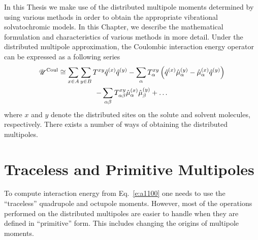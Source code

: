 \documentclass[b5paper,oneside,fleqn,11pt]{book}
\begin{document}
\begin{appendices}
\begin{refsection}
In this Thesis we make use of the distributed multipole 
moments determined by using various methods in order to obtain
the appropriate vibrational solvatochromic models. In this Chapter,
we describe the mathematical formulation and characteristics of various methods
in more detail.
Under the distributed multipole approximation, the Coulombic
interaction energy operator can be expressed as a following series \citep{Stone.TheTheoryOfIntermolecularForces.1996}
%
\begin{multline} \label{e:a1100}
 \mathscr{U}^{\rm Coul} \cong \sum_{x\in A}\sum_{y\in B}  T^{xy}\hat{q}^{(x)}\hat{q}^{(y)} -
\sum_\alpha T^{xy}_\alpha \left( \hat{q}^{(x)} \hat{\mu}^{(y)}_\alpha - \hat{\mu}^{(x)}_\alpha \hat{q}^{(y)}\right)
\\
 - \sum_{\alpha\beta} T^{xy}_{\alpha\beta} \hat{\mu}^{(x)}_\alpha \hat{\mu}^{(y)}_\beta + \ldots
\end{multline}
%
where $x$ and $y$ denote the distributed sites on the solute and solvent
molecules, respectively. There exists a number of ways of obtaining
the distributed multipoles. 

\section{Traceless and Primitive Multipoles}

To compute interaction energy from Eq.~\eqref{e:a1100} one needs 
to use the ``traceless'' quadrupole and octupole moments. However, 
most of the operations performed on the distributed multipoles
are easier to handle when they are defined in ``primitive'' form.
This includes changing the origins of multipole moments.


\end{refsection}
\end{appendices}
\end{document}
